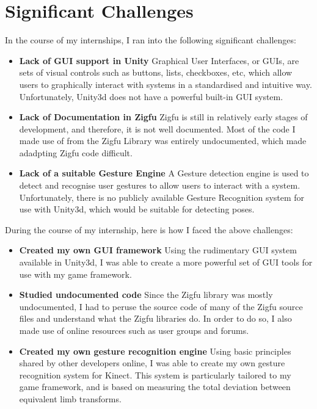 \documentclass{article}
\begin{document}
\section{Significant Challenges}
In the course of my internships, I ran into the following significant challenges:
\begin{itemize}
	\item \textbf{Lack of GUI support in Unity} Graphical User Interfaces, or GUIs, are sets of visual controls such as buttons, lists, checkboxes, etc, which allow users to graphically interact with systems in a standardised and intuitive way. Unfortunately, Unity3d does not have a powerful built-in GUI system. 

	\item \textbf{Lack of Documentation in Zigfu} Zigfu is still in relatively early stages of development, and therefore, it is not well documented. Most of the code I made use of from the Zigfu Library was entirely undocumented, which made adadpting Zigfu code difficult.

	\item \textbf{Lack of a suitable Gesture Engine} A Gesture detection engine is used to detect and recognise user gestures to allow users to interact with a system. Unfortunately, there is no publicly available Gesture Recognition system for use with Unity3d, which would be suitable for detecting poses. 
\end{itemize} 

During the course of my internship, here is how I faced the above challenges:

\begin{itemize}
	\item \textbf{Created my own GUI framework} Using the rudimentary GUI system available in Unity3d, I was able to create a more powerful set of GUI tools for use with my game framework. 

	\item \textbf{Studied undocumented code} Since the Zigfu library was mostly undocumented, I had to peruse the source code of many of the Zigfu source files and understand what the Zigfu libraries do. In order to do so, I also made use of online resources such as user groups and forums.

	\item \textbf{Created my own gesture recognition engine} Using basic principles shared by other developers online, I was able to create my own gesture recognition system for Kinect. This system is particularly tailored to my game framework, and is based on measuring the total deviation between equivalent limb transforms. 
		
\end{itemize}
\end{document}
